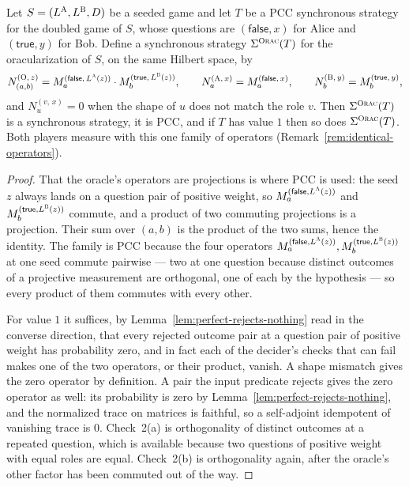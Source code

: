 \begin{lemma}
\label{lem:oracular-completeness}
\leanok
Let $S = (L^{\textsc{A}}, L^{\textsc{B}}, D)$ be a seeded game and let $T$ be a PCC synchronous strategy for
the doubled game of $S$, whose questions are $(\mathsf{false}, x)$ for Alice and
$(\mathsf{true}, y)$ for Bob. Define a synchronous strategy $\Sigma^{\textsc{Orac}}(T)$ for the
oracularization of $S$, on the same Hilbert space, by
\begin{equation*}
  N^{(\textsc{O},\, z)}_{(a,b)} = M^{(\mathsf{false},\, L^{\textsc{A}}(z))}_a \cdot
    M^{(\mathsf{true},\, L^{\textsc{B}}(z))}_b, \qquad
  N^{(\textsc{A},\, x)}_{a} = M^{(\mathsf{false},\, x)}_a, \qquad
  N^{(\textsc{B},\, y)}_{b} = M^{(\mathsf{true},\, y)}_b,
\end{equation*}
and $N^{(v,\, x)}_u = 0$ when the shape of $u$ does not match the role $v$. Then
$\Sigma^{\textsc{Orac}}(T)$ is a synchronous strategy, it is PCC, and if $T$ has value $1$ then so does
$\Sigma^{\textsc{Orac}}(T)$. Both players measure with this one family of operators
(Remark~\ref{rem:identical-operators}).
\end{lemma}
\begin{proof}
\leanok
That the oracle's operators are projections is where PCC is used: the seed $z$ always lands on
a question pair of positive weight, so $M^{(\mathsf{false}, L^{\textsc{A}}(z))}_a$ and
$M^{(\mathsf{true}, L^{\textsc{B}}(z))}_b$ commute, and a product of two commuting projections is a
projection. Their sum over $(a,b)$ is the product of the two sums, hence the identity. The
family is PCC because the four operators
$M^{(\mathsf{false}, L^{\textsc{A}}(z))}_a, M^{(\mathsf{true}, L^{\textsc{B}}(z))}_b$ at one seed commute
pairwise --- two at one question because distinct outcomes of a projective measurement are
orthogonal, one of each by the hypothesis --- so every product of them commutes with every
other.

For value $1$ it suffices, by Lemma~\ref{lem:perfect-rejects-nothing} read in the converse
direction, that every rejected outcome pair at a question pair of positive weight has
probability zero, and in fact each of the decider's checks that can fail makes one of the two
operators, or their product, vanish. A shape mismatch gives the zero operator by definition. A
pair the input predicate rejects gives the zero operator as well: its probability is zero by
Lemma~\ref{lem:perfect-rejects-nothing}, and the normalized trace on matrices is faithful, so
a self-adjoint idempotent of vanishing trace is $0$. Check~2(a) is orthogonality of distinct
outcomes at a repeated question, which is available because two questions of positive weight
with equal roles are equal. Check~2(b) is orthogonality again, after the oracle's other factor
has been commuted out of the way.
\end{proof}

